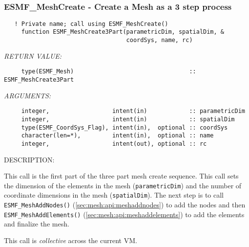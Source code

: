  
\mbox{}\hrulefill\ 
 
\subsubsection [ESMF\_MeshCreate] {ESMF\_MeshCreate - Create a Mesh as a 3 step process \label{sec:mesh:api:meshcreate}}


  
\begin{verbatim}   ! Private name; call using ESMF_MeshCreate()
     function ESMF_MeshCreate3Part(parametricDim, spatialDim, &
                                   coordSys, name, rc)\end{verbatim}{\em RETURN VALUE:}
\begin{verbatim}     type(ESMF_Mesh)                                 :: ESMF_MeshCreate3Part\end{verbatim}{\em ARGUMENTS:}
\begin{verbatim}     integer,                  intent(in)            :: parametricDim
     integer,                  intent(in)            :: spatialDim
     type(ESMF_CoordSys_Flag), intent(in),  optional :: coordSys
     character(len=*),         intent(in),  optional :: name
     integer,                  intent(out), optional :: rc\end{verbatim}
{\sf DESCRIPTION:\\ }


     This call is the first part of the three part mesh create
     sequence. This call sets the dimension of the elements in the mesh
     ({\tt parametricDim}) and the number of coordinate dimensions in the mesh
     ({\tt spatialDim}). The next step is to call {\tt ESMF\_MeshAddNodes()} (\ref{sec:mesh:api:meshaddnodes})
     to add the nodes and then {\tt ESMF\_MeshAddElements()} (\ref{sec:mesh:api:meshaddelements}) to add
     the elements and finalize the mesh.
  
     This call is {\em collective} across the current VM.
  

